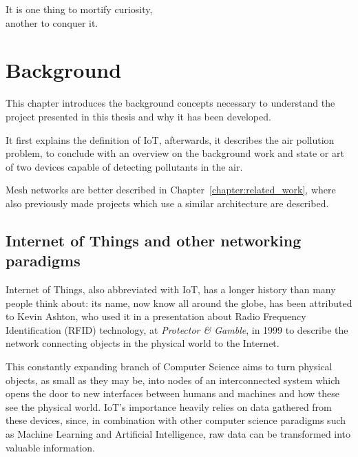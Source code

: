 
\begin{savequote}[70mm]
	It is one thing to mortify curiosity,\\another to conquer it.
\end{savequote}

\chapter{Background}\label{chapter:background}

	This chapter introduces the background concepts necessary to understand the project presented in this thesis and why it has been developed.
	
	It first explains the definition of IoT, afterwards, it describes the air pollution problem, to conclude with an overview on the background work and state or art of two devices capable of detecting pollutants in the air.

	Mesh networks are better described in Chapter~\ref{chapter:related_work}, where also previously made projects which use a similar architecture are described.

	\section{Internet of Things and other networking paradigms}
	
		
		Internet of Things, also abbreviated with IoT, has a longer history than many people think about: its name, now know all around the globe, has been attributed to Kevin Ashton, who used it in a presentation about Radio Frequency Identification (RFID) technology, at \textit{Protector \& Gamble}, in 1999 \cite{iot_definition} to describe the network connecting objects in the physical world to the Internet.
		
		This constantly expanding branch of Computer Science aims to turn physical objects, as small as they may be, into nodes of an interconnected system which opens the door to new interfaces between humans and machines and how these see the physical world.
		IoT's importance heavily relies on data gathered from these devices, since, in combination with other computer science paradigms such as Machine Learning and Artificial Intelligence, raw data can be transformed into valuable information.
	
